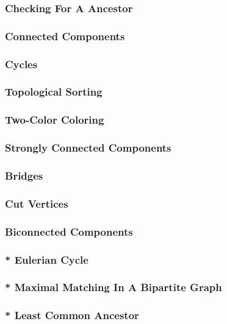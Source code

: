 \documentclass[a4paper,12pt]{article}
\begin{document}
      \subsubsection{Checking For A Ancestor}

      \subsubsection{Connected Components}
      
      \subsubsection{Cycles}
      
      \subsubsection{Topological Sorting}

      \subsubsection{Two-Color Coloring}

      \subsubsection{Strongly Connected Components}

      \subsubsection{Bridges}

      \subsubsection{Cut Vertices}

      \subsubsection{Biconnected Components}

      \subsubsection{* Eulerian Cycle}

      \subsubsection{* Maximal Matching In A Bipartite Graph}

      \subsubsection{* Least Common Ancestor}
\end{document}
